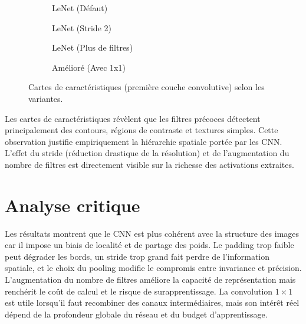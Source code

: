 \begin{figure}[H]
    \centering
    \begin{subfigure}[b]{0.48\textwidth}
        \caption{LeNet (Défaut)}
    \end{subfigure}
    \hfill
    \begin{subfigure}[b]{0.48\textwidth}
        \caption{LeNet (Stride 2)}
    \end{subfigure}
    
    \begin{subfigure}[b]{0.48\textwidth}
        \caption{LeNet (Plus de filtres)}
    \end{subfigure}
    \hfill
    \begin{subfigure}[b]{0.48\textwidth}
        \caption{Amélioré (Avec 1x1)}
    \end{subfigure}
    
    \caption{Cartes de caractéristiques (première couche convolutive) selon les variantes.}
\end{figure}
Les cartes de caractéristiques révèlent que les filtres précoces détectent principalement des contours, régions de contraste et textures simples. Cette observation justifie empiriquement la hiérarchie spatiale portée par les CNN. L'effet du stride (réduction drastique de la résolution) et de l'augmentation du nombre de filtres est directement visible sur la richesse des activations extraites.

\section{Analyse critique}
Les résultats montrent que le CNN est plus cohérent avec la structure des images car il impose un biais de localité et de partage des poids. Le padding trop faible peut dégrader les bords, un stride trop grand fait perdre de l’information spatiale, et le choix du pooling modifie le compromis entre invariance et précision. L’augmentation du nombre de filtres améliore la capacité de représentation mais renchérit le coût de calcul et le risque de surapprentissage. La convolution $1 \times 1$ est utile lorsqu’il faut recombiner des canaux intermédiaires, mais son intérêt réel dépend de la profondeur globale du réseau et du budget d’apprentissage.

